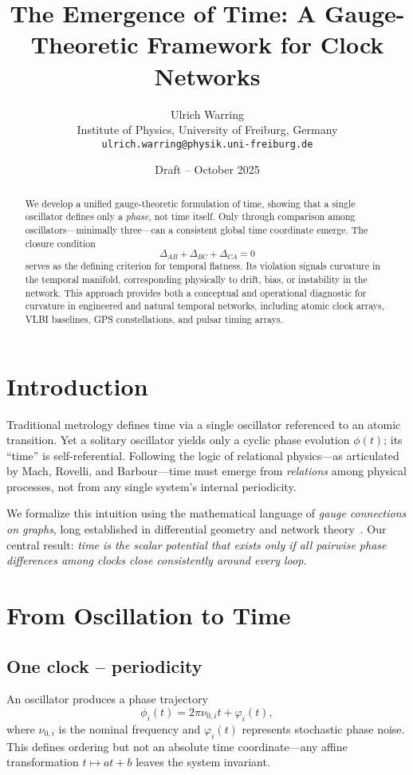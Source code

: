 \documentclass[11pt,a4paper]{article}
\title{\textbf{The Emergence of Time: A Gauge-Theoretic Framework for Clock Networks}}
\author{Ulrich Warring \\[2mm]
\small Institute of Physics, University of Freiburg, Germany \\[1mm]
\small \texttt{ulrich.warring@physik.uni-freiburg.de}}
\date{Draft -- October 2025}
\begin{document}
\maketitle

\begin{abstract}
We develop a unified gauge-theoretic formulation of time, showing that a single oscillator defines only a \emph{phase}, not time itself. 
Only through comparison among oscillators---minimally three---can a consistent global time coordinate emerge. 
The closure condition
\[
\Delta_{AB} + \Delta_{BC} + \Delta_{CA} = 0
\]
serves as the defining criterion for temporal flatness. 
Its violation signals curvature in the temporal manifold, corresponding physically to drift, bias, or instability in the network. 
This approach provides both a conceptual and operational diagnostic for curvature in engineered and natural temporal networks, including atomic clock arrays, VLBI baselines, GPS constellations, and pulsar timing arrays.
\end{abstract}

\section{Introduction}
Traditional metrology defines time via a single oscillator referenced to an atomic transition. 
Yet a solitary oscillator yields only a cyclic phase evolution $\phi(t)$; its ``time'' is self-referential. 
Following the logic of relational physics---as articulated by Mach, Rovelli, and Barbour---time must emerge from \emph{relations} among physical processes, not from any single system's internal periodicity.

We formalize this intuition using the mathematical language of \emph{gauge connections on graphs}, long established in differential geometry and network theory~\citep{Frankel2011}. 
Our central result: \emph{time is the scalar potential that exists only if all pairwise phase differences among clocks close consistently around every loop.}

\section{From Oscillation to Time}

\subsection{One clock – periodicity}
An oscillator produces a phase trajectory
\begin{equation}
\phi_i(t) = 2\pi\nu_{0,i} t + \varphi_i(t),
\end{equation}
where $\nu_{0,i}$ is the nominal frequency and $\varphi_i(t)$ represents stochastic phase noise. 
This defines ordering but not an absolute time coordinate—any affine transformation $t \mapsto at+b$ leaves the system invariant.
\end{document}

